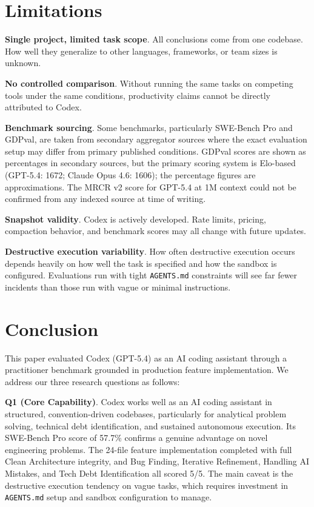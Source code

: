 \documentclass[conference]{IEEEtran}
\begin{document}
\section{Limitations}

\textbf{Single project, limited task scope}. All conclusions come from one codebase. How well they generalize to other languages, frameworks, or team sizes is unknown.

\textbf{No controlled comparison}. Without running the same tasks on competing tools under the same conditions, productivity claims cannot be directly attributed to Codex.

\textbf{Benchmark sourcing}. Some benchmarks, particularly SWE-Bench Pro and GDPval, are taken from secondary aggregator sources where the exact evaluation setup may differ from primary published conditions. GDPval scores are shown as percentages in secondary sources, but the primary scoring system is Elo-based (GPT-5.4: 1672; Claude Opus 4.6: 1606); the percentage figures are approximations. The MRCR v2 score for GPT-5.4 at 1M context could not be confirmed from any indexed source at time of writing.

\textbf{Snapshot validity}. Codex is actively developed. Rate limits, pricing, compaction behavior, and benchmark scores may all change with future updates.

\textbf{Destructive execution variability}. How often destructive execution occurs depends heavily on how well the task is specified and how the sandbox is configured. Evaluations run with tight \texttt{AGENTS.md} constraints will see far fewer incidents than those run with vague or minimal instructions.

\section{Conclusion}
This paper evaluated Codex (GPT-5.4) as an AI coding assistant through a practitioner benchmark grounded in production feature implementation. We address our three research questions as follows:

\textbf{Q1 (Core Capability)}. Codex works well as an AI coding assistant in structured, convention-driven codebases, particularly for analytical problem solving, technical debt identification, and sustained autonomous execution. Its SWE-Bench Pro score of 57.7\% confirms a genuine advantage on novel engineering problems. The 24-file feature implementation completed with full Clean Architecture integrity, and Bug Finding, Iterative Refinement, Handling AI Mistakes, and Tech Debt Identification all scored 5/5. The main caveat is the destructive execution tendency on vague tasks, which requires investment in \texttt{AGENTS.md} setup and sandbox configuration to manage.
\end{document}
